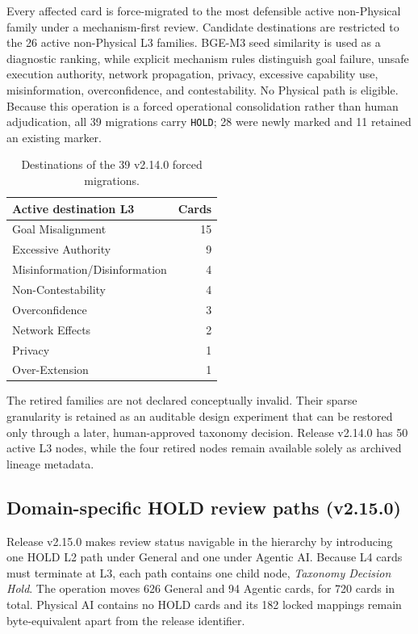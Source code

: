 \documentclass[11pt,a4paper]{article}
\newcommand{\code}[1]{\texttt{#1}}
\begin{document}
\begin{appendices}
Every affected card is force-migrated to the most defensible active
non-Physical family under a mechanism-first review. Candidate destinations are
restricted to the 26 active non-Physical L3 families. BGE-M3 seed similarity is
used as a diagnostic ranking, while explicit mechanism rules distinguish goal
failure, unsafe execution authority, network propagation, privacy, excessive
capability use, misinformation, overconfidence, and contestability. No
Physical path is eligible. Because this operation is a forced operational
consolidation rather than human adjudication, all 39 migrations carry
\code{HOLD}; 28 were newly marked and 11 retained an existing marker.

\begin{table}[H]
\centering
\caption{Destinations of the 39 v2.14.0 forced migrations.}
\small
\begin{tabular}{lr}
\toprule
Active destination L3 & Cards \\
\midrule
Goal Misalignment & 15 \\
Excessive Authority & 9 \\
Misinformation/Disinformation & 4 \\
Non-Contestability & 4 \\
Overconfidence & 3 \\
Network Effects & 2 \\
Privacy & 1 \\
Over-Extension & 1 \\
\bottomrule
\end{tabular}
\end{table}

The retired families are not declared conceptually invalid. Their sparse
granularity is retained as an auditable design experiment that can be restored
only through a later, human-approved taxonomy decision. Release v2.14.0 has 50
active L3 nodes, while the four retired nodes remain available solely as
archived lineage metadata.

\subsection{Domain-specific HOLD review paths (v2.15.0)}

Release v2.15.0 makes review status navigable in the hierarchy by introducing
one HOLD L2 path under General and one under Agentic AI. Because L4 cards must
terminate at L3, each path contains one child node, \textit{Taxonomy Decision
Hold}. The operation moves 626 General and 94 Agentic cards, for 720 cards in
total. Physical AI contains no HOLD cards and its 182 locked mappings remain
byte-equivalent apart from the release identifier.


\end{appendices}
\end{document}
